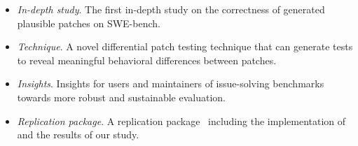 \begin{itemize}[leftmargin=*]

    \item \emph{In-depth study}. The first in-depth study on the correctness of generated plausible patches on SWE-bench. 

    \item \emph{Technique}. A novel differential patch testing technique \appname that can generate tests to reveal meaningful behavioral differences between patches.

    \item \emph{Insights}. Insights for users and maintainers of issue-solving benchmarks towards more robust and sustainable evaluation.

    \item \emph{Replication package}. A replication package~\cite{package} including the implementation of \appname and the results of our study.
    





\end{itemize}


